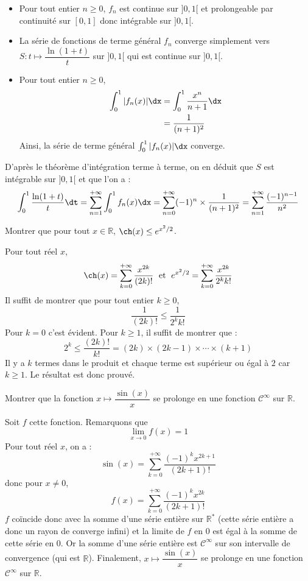 \documentclass[a4paper,10pt]{report}
\begin{document}
\begin{itemize}
\item Pour tout entier $n \geq 0$, $f_n$ est continue sur $]0,1[$ et prolongeable par continuité sur $[0,1]$ donc intégrable sur $]0,1[$.
\item La série de fonctions de terme général $f_n$ converge simplement vers $S: t \mapsto \dfrac{\ln(1+t)}{t}$ sur $]0,1[$ qui est continue sur $]0,1[$.
\item Pour tout entier $n \geq 0$,
\begin{align*}
\int_0^1 \vert f_n(x) \vert\dx & = \int_0^1 \dfrac{x^n}{n+1} \dx \\
& = \dfrac{1}{(n+1)^2}
\end{align*}
Ainsi, la série de terme général $\int_0^1 \vert f_n(x) \vert\dx$ converge.
\end{itemize}
D'après le théorème d'intégration terme à terme, on en déduit que $S$ est intégrable sur $]0,1[$ et que l'on a :
$$ \int_0^1 \dfrac{\ln(1+t)}{t} \dt = \sum_{n=1}^{+ \infty} \int_0^1 f_n(x) \dx = \sum_{n=0}^{+ \infty} (-1)^{n} \times \dfrac{1}{(n+1)^2} = \sum_{n=1}^{+ \infty} \dfrac{(-1)^{n-1}}{n^2}$$


\begin{Exercice}{} Montrer que pour tout $x \in \mathbb{R}$, $\ch(x) \leq e^{x^2/2}$.
\end{Exercice}

\corr Pour tout réel $x$,
$$ \ch(x) = \sum_{k=0}^{+ \infty} \dfrac{x^{2k}}{(2k)!} \; \hbox{ et } \; e^{x^2/2} = \sum_{k=0}^{+ \infty} \dfrac{x^{2k}}{2^k k!}$$
Il suffit de montrer que pour tout entier $k \geq 0$,
$$ \dfrac{1}{(2k)!} \leq \dfrac{1}{2^k	k!}$$
Pour $k=0$ c'est évident. Pour $k \geq 1$, il suffit de montrer que :
$$ 2^k \leq \dfrac{(2k)!}{k!} = (2k) \times (2k-1) \times \cdots \times (k+1)$$
Il y a $k$ termes dans le produit et chaque terme est supérieur ou égal à $2$ car $k \geq 1$. Le résultat est donc prouvé.

\begin{Exercice}{} Montrer que la fonction $x \mapsto \dfrac{\sin(x)}{x}$ se prolonge en une fonction $\mathcal{C}^{\infty}$ sur $\mathbb{R}$.
\end{Exercice}

\corr Soit $f$ cette fonction. Remarquons que 
$$ \lim_{x \rightarrow 0} f(x) = 1$$
Pour tout réel $x$, on a :
$$ \sin(x) = \sum_{k=0}^{+ \infty} \dfrac{(-1)^k x^{2k+1}}{(2k+1)!}$$
donc pour $x \neq 0$,
$$ f(x) = \sum_{k=0}^{+ \infty} \dfrac{(-1)^k x^{2k}}{(2k+1)!}$$
$f$ coïncide donc avec la somme d'une série entière sur $\mathbb{R}^*$ (cette série entière a donc un rayon de converge infini) et la limite de $f$ en $0$ est égal à la somme de cette série en $0$. Or la somme d'une série entière est $\mathcal{C}^{\infty}$ sur son intervalle de convergence (qui est $\mathbb{R}$). Finalement, $x \mapsto \dfrac{\sin(x)}{x}$ se prolonge en une fonction $\mathcal{C}^{\infty}$ sur $\mathbb{R}$.
\end{document}
